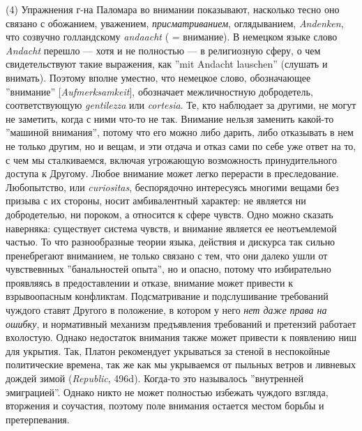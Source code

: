 \documentclass[12pt]{book}
\begin{document}
(4) Упражнения г-на Паломара во внимании показывают, насколько тесно оно связано с обожанием, уважением, \textit{присматриванием}, оглядыванием, \textit{Andenken}, что созвучно голландскому \textit{andaacht} ( = внимание). В немецком языке слово \textit{Andacht} перешло --- хотя и не полностью --- в религиозную сферу, о чем свидетельствуют такие выражения, как ''mit Andacht lauschen'' (слушать и внимать). Поэтому вполне уместно, что немецкое слово, обозначающее ''внимание'' [\textit{Aufmerksamkeit}], обозначает межличностную добродетель, соответствующую \textit{gentilezza} или \textit{cortesia}. Те, кто наблюдает за другими, не могут не заметить, когда с ними что-то не так. Внимание нельзя заменить какой-то ''машиной внимания'', потому что его можно либо дарить, либо отказывать в нем не только другим, но и вещам, и эти отдача и отказ сами по себе уже ответ на то, с чем мы сталкиваемся, включая угрожающую возможность принудительного доступа к Другому. Любое внимание может легко перерасти в преследование. Любопытство, или \textit{curiositas}, беспорядочно интересуясь многими вещами без призыва с их стороны, носит амбивалентный характер: не является ни добродетелью, ни пороком, а относится к сфере чувств. Одно можно сказать наверняка: существует система чувств, и внимание является ее неотъемлемой частью. То что разнообразные теории языка, действия и дискурса так сильно пренебрегают вниманием, не только связано с тем, что они далеко ушли от чувствевнных ''банальностей опыта'', но и опасно, потому что избирательно проявляясь в предоставлении и отказе, внимание может привести к взрывоопасным конфликтам. Подсматривание и подслушивание требований чуждого ставят Другого в положение, в котором у него \textit{нет даже права на ошибку}, и нормативный механизм предъявления требований и претензий работает вхолостую. Однако недостаток внимания также может привести к появлению ниш для укрытия. Так, Платон рекомендует укрываться за стеной в неспокойные политические времена, так же как мы укрываемся от пыльных ветров и ливневых дождей зимой (\textit{Republic}, 496d). Когда-то это называлось ''внутренней эмиграцией''. Однако никто не может полностью избежать чуждого взгляда, вторжения и соучастия, поэтому поле внимания остается местом борьбы и претерпевания.
\end{document}

